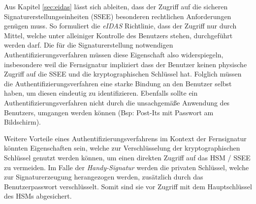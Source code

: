 \documentclass[11pt,a4paper,ngerman]{scrreprt}
\begin{document}
Aus Kapitel \ref{sec:eidas} lässt sich ableiten, dass der Zugriff auf die sicheren Signaturerstellungseinheiten (SSEE) besonderen rechtlichen Anforderungen genügen muss. So formuliert die \textit{eIDAS} Richtlinie, dass der Zugriff nur durch Mittel, welche unter alleiniger Kontrolle des Benutzers stehen, durchgeführt werden darf. Die für die Signaturerstellung notwendigen Authentifizierungsverfahren müssen diese Eigenschaft also widerspiegeln, insbesondere weil die Fernsignatur impliziert dass der Benutzer keinen physische Zugriff auf die SSEE und die kryptographischen Schlüssel hat. Folglich müssen die Authentifizierungsverfahren eine starke Bindung an den Benutzer selbst haben, um diesen eindeutig zu identifizieren. Ebenfalls sollte ein Authentifizierungsverfahren nicht durch die unsachgemäße Anwendung des Benutzers, umgangen werden können (Bsp: Post-Its mit Passwort am Bildschirm).

Weitere Vorteile eines Authentifizierungsverfahrens im Kontext der Fernsignatur könnten Eigenschaften sein, welche zur Verschlüsselung der kryptographischen Schlüssel genutzt werden können, um einen direkten Zugriff auf das HSM / SSEE zu vermeiden. Im Falle der \textit{Handy-Signatur} werden die privaten Schlüssel, welche zur Signaturerzeugung herangezogen werden, zusätzlich durch das Benutzerpasswort verschlüsselt. Somit sind sie vor Zugriff mit dem Hauptschlüssel des HSMs abgesichert. 
\end{document}

